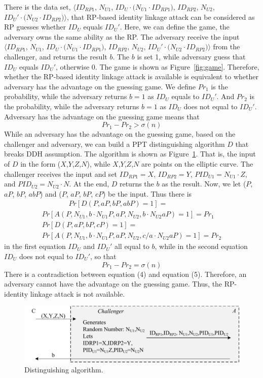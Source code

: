 There is the data set, $\langle ID_{RP1}$, $N_{U1}$, $ID_U \cdot{(N_{U1} \cdot {ID_{RP1})}}$, $ID_{RP2}$, $N_{U2}$, $ID_U' \cdot{(N_{U2} \cdot {ID_{RP2})}}\rangle$, that RP-based identity linkage attack can be considered as RP guesses whether $ID_U$ equals $ID_U'$.
Here, we can define the game, the adversary owns the same ability as the RP. The adversary receive the input $\langle ID_{RP1}$, $N_{U1}$, $ID_U \cdot{(N_{U1} \cdot {ID_{RP1})}}$, $ID_{RP2}$, $N_{U2}$, $ID_U' \cdot{(N_{U2} \cdot {ID_{RP2})}}\rangle$ from the challenger, and returns the result $b$.
The $b$ is set 1, while adversary guess that $ID_U$ equals $ID_U'$, otherwise 0. The game is shown as Figure~\ref{fig:game}.
Therefore, whether the RP-based identity linkage attack is available is equivalent to whether adversary has the advantage on the guessing game.
We define $Pr_1$ is the probability, while the adversary returns $b=1$ as $ID_U$ equals to $ID_U'$. And $Pr_2$ is the probability, while the adversary returns $b=1$ as $ID_U$ does not equal to $ID_U'$.
Adversary has the advantage on the guessing game means that
\vspace{-\topsep}
\begin{equation}
Pr_1-Pr_2>\sigma(n)
\end{equation}
While an adversary has the advantage on the guessing game, based on the challenger and adversary, we can build a PPT distinguishing algorithm $D$ that breaks DDH assumption. The algorithm is shown as Figure~\ref{fig:dalgorithm}. That is, the input of $D$ in the form ($X$,$Y$,$Z$,$N$), while $X$,$Y$,$Z$,$N$ are points on the elliptic curve. The challenger receives the input and set $ID_{RP1}=X$, $ID_{RP2}=Y$, $PID_{U1}=N_{U1} \cdot{Z}$, and $PID_{U2}=N_{U2} \cdot{N}$.  At the end, $D$ returns the $b$ as the result.
Now, we let ($P$, $aP$, $bP$, $abP$) and  ($P$, $aP$, $bP$, $cP$) be the input. Thus there is
\vspace{-\topsep}
\begin{multline*}
\ \ \ \ \ \ \ \ \ \ \ \ \ \ \ \ \ Pr[D(P,aP,bP,abP)=1]=\\ Pr[A(P, N_{U1}, b \cdot{N_{U1}P}, aP, N_{U2},b\cdot{N_{U2} aP})=1]=Pr_1\\
Pr[D(P,aP,bP,cP)=1]=\ \ \ \ \ \ \ \ \ \
\\ Pr[A(P, N_{U1}, b \cdot{N_{U1}P}, aP, N_{U2},c/a \cdot{N_{U2}aP})=1]=Pr_2
\end{multline*}
in the first equation $ID_{U} $ and $ ID_{U}'$ all equal to $b$, while in the second equation $ID_{U}$ does not equal to $ID_{U}'$, so that
\begin{equation}
Pr_1-Pr_2=\sigma(n)
\end{equation}
There is a contradiction between equation (4) and equation (5). Therefore, an adversary cannot have the advantage on the guessing game. Thus, the RP-identity linkage attack is not available.


\begin{figure}[t]
  \centering
  \includegraphics[width=1\linewidth]{fig/dalgorithm.pdf}
  \caption{Distinguishing algorithm.}
  \label{fig:dalgorithm}
\end{figure}
